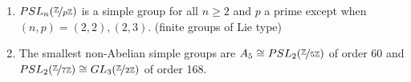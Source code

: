 \begin{property}
    \leavevmode
    \begin{enumerate}
        \item \(PSL_n(\nicefrac{\mathbb{\MakeUppercase{Z}} }{p\mathbb{\MakeUppercase{Z}} })\) is a simple group for all \(n \geq 2\) and \(p\) a prime except when \((n,p) = (2,2),(2,3)\). (finite groups of Lie type)
        \item The smallest non-Abelian simple groups are \(A_5 \cong PSL_2(\nicefrac{\mathbb{\MakeUppercase{Z}}}{5\mathbb{\MakeUppercase{Z}}})\) of order 60 and \(PSL_2(\nicefrac{\mathbb{\MakeUppercase{Z}} }{7\mathbb{\MakeUppercase{Z}}})\cong GL_3(\nicefrac{\mathbb{\MakeUppercase{Z}}}{2\mathbb{\MakeUppercase{Z}} })\) of order 168.
    \end{enumerate}
\end{property}
